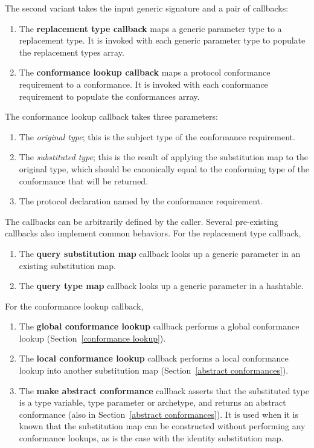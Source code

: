 \documentclass[../generics]{subfiles}
\begin{document}
The second variant takes the input generic signature and a pair of callbacks:
\begin{enumerate}
\item The \textbf{replacement type callback} maps a generic parameter type to a replacement type. It is invoked with each generic parameter type to populate the replacement types array.
\item The \textbf{conformance lookup callback} maps a protocol conformance requirement to a conformance. It is invoked with each conformance requirement to populate the conformances array.
\end{enumerate}
The conformance lookup callback takes three parameters:
\begin{enumerate}
\item The \emph{original type}; this is the subject type of the conformance requirement.
\item The \emph{substituted type}; this is the result of applying the substitution map to the original type, which should be canonically equal to the conforming type of the conformance that will be returned.
\item The protocol declaration named by the conformance requirement.
\end{enumerate}
The callbacks can be arbitrarily defined by the caller. Several pre-existing callbacks also implement common behaviors. For the replacement type callback,
\begin{enumerate}
\item The \textbf{query substitution map} callback looks up a generic parameter in an existing substitution map.
\item The \textbf{query type map} callback looks up a generic parameter in a hashtable.
\end{enumerate}
For the conformance lookup callback,
\begin{enumerate}
\item The \textbf{global conformance lookup} callback performs a global conformance lookup (Section~\ref{conformance lookup}).
\item The \textbf{local conformance lookup} callback performs a local conformance lookup into another substitution map (Section~\ref{abstract conformances}).
\item The \textbf{make abstract conformance} callback asserts that the substituted type is a type variable, type parameter or archetype, and returns an abstract conformance (also in Section~\ref{abstract conformances}). It is used when it is known that the substitution map can be constructed without performing any conformance lookups, as is the case with the identity substitution map.
\end{enumerate}
\end{document}
